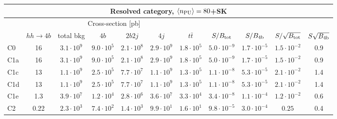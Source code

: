 \begin{tabular}{|l|cc|cccc|cccc|}
  \hline
\multicolumn{11}{|c|}{Resolved category, $\left\langle n_{\rm PU}\right\rangle=80$+SK}\\
\hline
&  \multicolumn{6}{c|}{Cross-section [pb]} &  &  & &  \\
   &  $hh\to 4b$ &  total bkg  &   $4b$    &  $2b2j$   &   $4j$    &
$t\bar{t}$ &
$S/B_{\rm tot}$ & $S/B_{\rm 4b}$ & $S/\sqrt{B_{\rm tot}}$ & $S\sqrt{B_{\rm 4b}}$ \\
  \hline
  \hline
 C0    & 16  &   $3.1\cdot 10^9$   & $9.0\cdot 10^5$ & $2.1\cdot 10^8$ & $2.9\cdot 10^9$ & $1.8\cdot 10^5$ &   $5.0\cdot 10^{-9}$   & $1.7\cdot 10^{-5}$ &   $1.5\cdot 10^{-2}$   & 0.9 \\
 C1a   & 16  &   $3.1\cdot 10^9$   & $9.0\cdot 10^5$ & $2.1\cdot 10^8$ & $2.9\cdot 10^9$ & $1.8\cdot 10^5$ &   $5.0\cdot 10^{-9}$   & $1.7\cdot 10^{-5}$  &   $1.5\cdot 10^{-2}$   & 0.9 \\
 C1c   & 13  &   $1.1\cdot 10^9$   & $2.5\cdot 10^5$ & $7.7\cdot 10^7$ & $1.1\cdot 10^9$ & $1.3\cdot 10^5$ &   $1.1\cdot 10^{-8}$   & $5.3\cdot 10^{-5}$  &   $2.1\cdot 10^{-2}$   & 1.4  \\
 C1d   & 13 &   $1.1\cdot 10^9 $  & $2.5\cdot 10^5$ & $7.7\cdot 10^7$ & $1.1\cdot 10^9$ & $1.3\cdot 10^5$  &   $1.1\cdot 10^{-8}$   & $5.3\cdot 10^{-5}$  &   $2.1\cdot 10^{-2}$   & 1.4\\
 C1e   & 1.3  &   $3.9\cdot 10^7$   & $1.2\cdot 10^4$ & $2.8\cdot 10^6$ & $3.6\cdot 10^7$ & $3.3\cdot 10^4$  &   $3.4\cdot 10^{-8}$   & $1.1\cdot 10^{-4}$ &   $1.2\cdot 10^{-2}$   & 0.6\\
 C2    & 0.22  &   $2.3\cdot 10^3$   & $7.4\cdot 10^2$ & $1.4\cdot 10^3$ & $9.9\cdot 10^1$ & $1.6\cdot 10^1$  &   $9.8\cdot 10^{-5}$   & $3.0\cdot 10^{-4}$  &  $0.25$   & 0.4 \\
\hline
\end{tabular}
